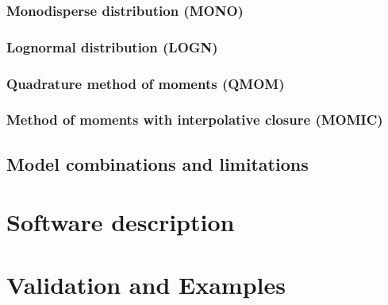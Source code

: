 \documentclass[preprint,12pt,letterpaper]{elsarticle}
\begin{document}
\subsubsection{Monodisperse distribution (MONO)}
\label{sss:mono}

\subsubsection{Lognormal distribution (LOGN)}
\label{sss:logn}

\subsubsection{Quadrature method of moments (QMOM)}
\label{sss:qmom}

\subsubsection{Method of moments with interpolative closure (MOMIC)}
\label{sss:momic}


\subsection{Model combinations and limitations}
\label{ss:limitations}


\section{Software description}
\label{s:architecture}

%
%


\section{Validation and Examples}
\label{s:examples}
\end{document}

